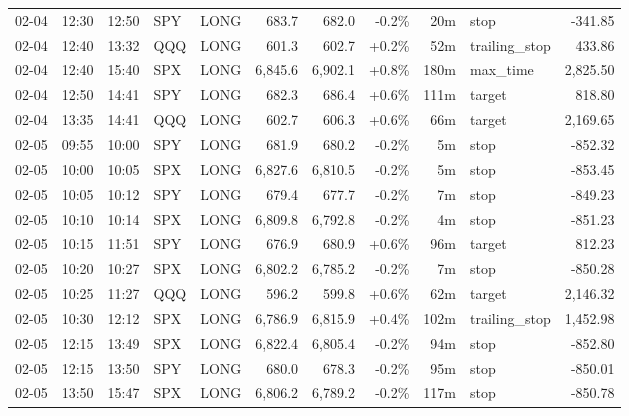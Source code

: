 \documentclass[11pt,a4paper,twoside]{article}
\begin{document}
\begin{center}
\begin{longtable}{>{\color{txtmain}}l l l l l r r r r >{\color{txtmain}}l r}
02-04 & 12:30 & 12:50 & SPY & LONG & 683.7 & 682.0 & \textcolor{lossred}{-0.2\%} & 20m & stop & \textcolor{lossred}{-341.85} \\
02-04 & 12:40 & 13:32 & QQQ & LONG & 601.3 & 602.7 & \textcolor{wingreen}{+0.2\%} & 52m & trailing\_stop & \textcolor{wingreen}{433.86} \\
02-04 & 12:40 & 15:40 & SPX & LONG & 6,845.6 & 6,902.1 & \textcolor{wingreen}{+0.8\%} & 180m & max\_time & \textcolor{wingreen}{2,825.50} \\
02-04 & 12:50 & 14:41 & SPY & LONG & 682.3 & 686.4 & \textcolor{wingreen}{+0.6\%} & 111m & target & \textcolor{wingreen}{818.80} \\
02-04 & 13:35 & 14:41 & QQQ & LONG & 602.7 & 606.3 & \textcolor{wingreen}{+0.6\%} & 66m & target & \textcolor{wingreen}{2,169.65} \\
02-05 & 09:55 & 10:00 & SPY & LONG & 681.9 & 680.2 & \textcolor{lossred}{-0.2\%} & 5m & stop & \textcolor{lossred}{-852.32} \\
02-05 & 10:00 & 10:05 & SPX & LONG & 6,827.6 & 6,810.5 & \textcolor{lossred}{-0.2\%} & 5m & stop & \textcolor{lossred}{-853.45} \\
02-05 & 10:05 & 10:12 & SPY & LONG & 679.4 & 677.7 & \textcolor{lossred}{-0.2\%} & 7m & stop & \textcolor{lossred}{-849.23} \\
02-05 & 10:10 & 10:14 & SPX & LONG & 6,809.8 & 6,792.8 & \textcolor{lossred}{-0.2\%} & 4m & stop & \textcolor{lossred}{-851.23} \\
02-05 & 10:15 & 11:51 & SPY & LONG & 676.9 & 680.9 & \textcolor{wingreen}{+0.6\%} & 96m & target & \textcolor{wingreen}{812.23} \\
02-05 & 10:20 & 10:27 & SPX & LONG & 6,802.2 & 6,785.2 & \textcolor{lossred}{-0.2\%} & 7m & stop & \textcolor{lossred}{-850.28} \\
02-05 & 10:25 & 11:27 & QQQ & LONG & 596.2 & 599.8 & \textcolor{wingreen}{+0.6\%} & 62m & target & \textcolor{wingreen}{2,146.32} \\
02-05 & 10:30 & 12:12 & SPX & LONG & 6,786.9 & 6,815.9 & \textcolor{wingreen}{+0.4\%} & 102m & trailing\_stop & \textcolor{wingreen}{1,452.98} \\
02-05 & 12:15 & 13:49 & SPX & LONG & 6,822.4 & 6,805.4 & \textcolor{lossred}{-0.2\%} & 94m & stop & \textcolor{lossred}{-852.80} \\
02-05 & 12:15 & 13:50 & SPY & LONG & 680.0 & 678.3 & \textcolor{lossred}{-0.2\%} & 95m & stop & \textcolor{lossred}{-850.01} \\
02-05 & 13:50 & 15:47 & SPX & LONG & 6,806.2 & 6,789.2 & \textcolor{lossred}{-0.2\%} & 117m & stop & \textcolor{lossred}{-850.78} \\

\end{longtable}
\end{center}
\end{document}
